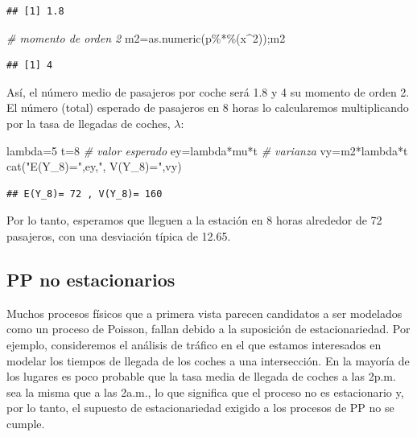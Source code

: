 \documentclass[
]{book}
\newenvironment{Shaded}{\begin{snugshade}}{\end{snugshade}}
\newcommand{\CommentTok}[1]{\textcolor[rgb]{0.56,0.35,0.01}{\textit{#1}}}
\newcommand{\DecValTok}[1]{\textcolor[rgb]{0.00,0.00,0.81}{#1}}
\newcommand{\FunctionTok}[1]{\textcolor[rgb]{0.00,0.00,0.00}{#1}}
\newcommand{\NormalTok}[1]{#1}
\newcommand{\OtherTok}[1]{\textcolor[rgb]{0.56,0.35,0.01}{#1}}
\newcommand{\SpecialCharTok}[1]{\textcolor[rgb]{0.00,0.00,0.00}{#1}}
\newcommand{\StringTok}[1]{\textcolor[rgb]{0.31,0.60,0.02}{#1}}
\theoremstyle{definition}
\theoremstyle{definition}
\theoremstyle{definition}
\theoremstyle{definition}
\theoremstyle{remark}
\begin{document}
\begin{verbatim}
## [1] 1.8
\end{verbatim}

\begin{Shaded}
\begin{Highlighting}[]
\CommentTok{\# momento de orden 2}
\NormalTok{m2}\OtherTok{=}\FunctionTok{as.numeric}\NormalTok{(p}\SpecialCharTok{\%*\%}\NormalTok{(x}\SpecialCharTok{\^{}}\DecValTok{2}\NormalTok{));m2}
\end{Highlighting}
\end{Shaded}

\begin{verbatim}
## [1] 4
\end{verbatim}

Así, el número medio de pasajeros por coche será 1.8 y 4 su momento de orden 2. El número (total) esperado de pasajeros en 8 horas lo calcularemos multiplicando por la tasa de llegadas de coches, \(\lambda\):

\begin{Shaded}
\begin{Highlighting}[]
\NormalTok{lambda}\OtherTok{=}\DecValTok{5}
\NormalTok{t}\OtherTok{=}\DecValTok{8}
\CommentTok{\# valor esperado}
\NormalTok{ey}\OtherTok{=}\NormalTok{lambda}\SpecialCharTok{*}\NormalTok{mu}\SpecialCharTok{*}\NormalTok{t}
\CommentTok{\# varianza}
\NormalTok{vy}\OtherTok{=}\NormalTok{m2}\SpecialCharTok{*}\NormalTok{lambda}\SpecialCharTok{*}\NormalTok{t}
\FunctionTok{cat}\NormalTok{(}\StringTok{"E(Y\_8)="}\NormalTok{,ey,}\StringTok{", V(Y\_8)="}\NormalTok{,vy)}
\end{Highlighting}
\end{Shaded}

\begin{verbatim}
## E(Y_8)= 72 , V(Y_8)= 160
\end{verbatim}

Por lo tanto, esperamos que lleguen a la estación en 8 horas alrededor de 72 pasajeros, con una desviación típica de 12.65.

\hypertarget{pp_noestacionarios}{%
\subsection{PP no estacionarios}\label{pp_noestacionarios}}

Muchos procesos físicos que a primera vista parecen candidatos a ser modelados como un proceso de Poisson, fallan debido a la suposición de estacionariedad. Por ejemplo, consideremos el análisis de tráfico en el que estamos interesados en modelar los tiempos de llegada de los coches a una intersección. En la mayoría de los lugares es poco probable que la tasa media de llegada de coches a las 2p.m. sea la misma que a las 2a.m., lo que significa que el proceso no es estacionario y, por lo tanto, el supuesto de estacionariedad exigido a los procesos de PP no se cumple.
\end{document}
